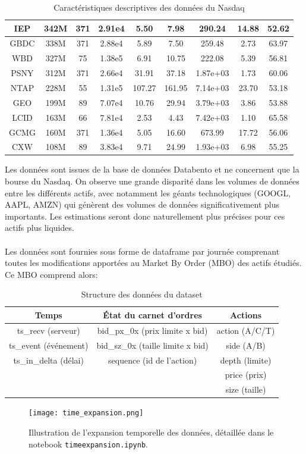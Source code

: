 \documentclass[10pt,a4paper]{article}
\theoremstyle{definition}
\theoremstyle{remark}
\begin{document}
\begin{table}[h!]
\begin{tabular}{|c|c|c|c|c|c|c|c|c|}
IEP & 342M & 371 & 2.91e4 & 5.50 & 7.98 & 290.24 & 14.88 & 52.62 \\ \hline
GBDC & 338M & 371 & 2.88e4 & 5.89 & 7.50 & 259.48 & 2.73 & 63.97 \\ \hline
WBD & 327M & 75 & 1.38e5 & 6.91 & 10.75 & 222.08 & 5.39 & 56.81 \\ \hline
PSNY & 312M & 371 & 2.66e4 & 31.91 & 37.18 & 1.87e+03 & 1.73 & 60.06 \\ \hline
NTAP & 228M & 55 & 1.31e5 & 107.27 & 161.95 & 7.14e+03 & 23.70 & 53.18 \\ \hline
GEO & 199M & 89 & 7.07e4 & 10.76 & 29.94 & 3.79e+03 & 3.86 & 53.88 \\ \hline
LCID & 163M & 66 & 7.81e4 & 2.53 & 4.43 & 7.42e+03 & 1.10 & 65.58 \\ \hline
GCMG & 160M & 371 & 1.36e4 & 5.05 & 16.60 & 673.99 & 17.72 & 56.06 \\ \hline
CXW & 108M & 89 & 3.83e4 & 9.71 & 24.99 & 1.93e+03 & 6.98 & 55.25 \\ \hline
\end{tabular}
\caption{Caractéristiques descriptives des données du Nasdaq}
\label{tab:donnees_nasdaq}
\end{table}

Les données sont issues de la base de données Databento et ne concernent que la bourse du Nasdaq. On observe une grande disparité dans les volumes de données entre les différents actifs, avec notamment les géants technologiques (GOOGL, AAPL, AMZN) qui génèrent des volumes de données significativement plus importants. Les estimations seront donc naturellement plus précises pour ces actifs plus liquides.
\\
\\
Les données sont fournies sous forme de dataframe par journée comprenant toutes les modifications apportées au Market By Order (MBO) des actifs étudiés. Ce MBO comprend alors:
\begin{table}[h!]
\centering
\begin{tabular}{|c|c|c|}
\hline
\textbf{Temps} & \textbf{État du carnet d'ordres} & \textbf{Actions} \\
\hline
ts\_recv (serveur) & bid\_px\_0x (prix limite x bid) & action (A/C/T) \\
ts\_event (événement) & bid\_sz\_0x (taille limite x bid) & side (A/B) \\
ts\_in\_delta (délai) & sequence (id de l'action) & depth (limite) \\
& & price (prix) \\
& & size (taille) \\
\hline
\end{tabular}
\caption{Structure des données du dataset}
\end{table}
\begin{figure}[h!]
\centering
        \texttt{[image: time\_expansion.png]}
    \caption{Illustration de l'expansion temporelle des données, détaillée dans le notebook \texttt{timeexpansion.ipynb}.}
    \label{fig:time_expansion}
\end{figure}
\end{document}
